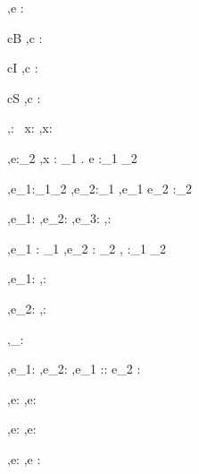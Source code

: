 



  {\Gamma,\Sigma \infers e : \tau}

  {c\in B}
  {\Gamma,\Sigma\infers c : \Bool}

    {c\in I}
    {\Gamma,\Sigma\infers c : \Int}

      {c\in S}
      {\Gamma,\Sigma\infers c : \String}

        { }
        {\Gamma,\Sigma\infers \unit : \Unit}
  {x:\tau\in\Gamma}
  {\Gamma,\Sigma\infers x:\tau}


  {\Gamma[x:\tau_1] ,\Sigma \infers e:\tau_2}
  {\Gamma,\Sigma \infers \lambda x : \tau_1 . e :\tau_1 \to \tau_2}

  {\Gamma,\Sigma \infers e_1:\tau_1\to\tau_2 \Quad
   \Gamma,\Sigma \infers e_2:\tau_1}
  {\Gamma,\Sigma \infers e_1 e_2 :\tau_2}


  {\Gamma,\Sigma \infers e_1:\Bool \Quad
   \Gamma,\Sigma \infers e_2:\tau \Quad
   \Gamma,\Sigma \infers e_3:\tau}
  {\Gamma,\Sigma \infers {}:\tau}


    {\Gamma,\Sigma \infers e_1 : \tau_1  \Quad
     \Gamma,\Sigma \infers e_2 : \tau_2}
    {\Gamma,\Sigma \infers {} :\tau_1 \times \tau_2}

  {\Gamma,\Sigma\infers e_1:\tau}
  {\Gamma,\Sigma\infers \Fst {}:\tau}

    {\Gamma,\Sigma\infers e_2:\tau}
    {\Gamma,\Sigma\infers \Snd {}:\tau}

  { }
  {\Gamma,\Sigma\infers [\ ]_\beta : \List\beta}

  {\Gamma,\Sigma\infers e_1:\beta \Quad
   \Gamma,\Sigma\infers e_2:\List\beta}
  {\Gamma,\Sigma\infers e_1 :: e_2 : \List \beta}

  {\Gamma,\Sigma\infers e:\List\beta}
  {\Gamma,\Sigma\infers \Head e:\beta}

    {\Gamma,\Sigma\infers e:\List\beta}
    {\Gamma,\Sigma\infers \Tail e:\List\beta}



  {\Gamma,\Sigma \infers e:\beta}
  {\Gamma,\Sigma \infers \Ref e :\Reference \beta}

